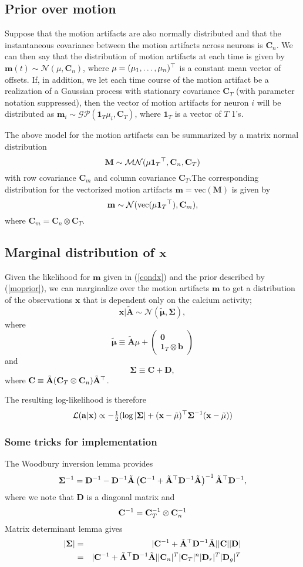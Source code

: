 \documentclass[11pt]{article}
\newcommand{\vecm}{\mathbf{m}}
\newcommand{\veca}{\mathbf{a}}
\newcommand{\matD}{\mathbf{D}}
\newcommand{\matC}{\mathbf{C}}
\newcommand{\vecb}{\mathbf{b}}
\newcommand{\vecx}{\mathbf{x}}
\newcommand{\matM}{\mathbf{M}}
\newcommand{\tA}{\tilde{\mathbf{A}}}
\newcommand{\margmu}{\tilde{\mathbf{\mu}}}
\newcommand{\matSig}{\mathbf{\Sigma}}
\begin{document}
\subsection{Prior over motion}
Suppose that the motion artifacts are also normally distributed and that the instantaneous covariance between the motion artifacts across neurons is $\matC_n$.  We can then say that the distribution of motion artifacts at each time is given by $\vecm(t)\sim\mathcal{N}(\mu,\matC_n)$, where $\mu = (\mu_1,\dots,\mu_n){^\top}$ is a constant mean vector of offsets.
If, in addition, we let each time course of the motion artifact be a realization of a Gaussian process with stationary covariance $\matC_T$ (with parameter notation suppressed), then the vector of motion artifacts for neuron $i$ will be distributed as $\vecm_i\sim\mathcal{GP}(\mathbf{1}_T\mu_i,\matC_T)$, where $\mathbf{1}_T$ is a vector of $T$ 1's. 

 The above model for the motion artifacts can be summarized by a matrix normal distribution
\begin{equation}\label{moprior}
\matM\sim\mathcal{MN}(\mu\mathbf{1}_T\trp,\matC_n,\matC_T)
\end{equation}
with row covariance $\matC_m$ and column covariance $\matC_T$.The corresponding distribution for the vectorized motion artifacts $\vecm = \text{vec}(\matM)$ is given by
\[
\vecm\sim \mathcal{N}(\text{vec}(\mu\mathbf{1}_T\trp),\matC_m),
\]
where $\matC_m = \matC_n\otimes\matC_T$.

\subsection{Marginal distribution of $\vecx$}
Given the likelihood for $\vecm$ given in (\ref{condx}) and the prior described by (\ref{moprior}), we can marginalize over the motion artifacts $\vecm$ to get a distribution of the observations $\vecx$ that is dependent only on the calcium activity;
\[
\vecx|\tA \sim\mathcal{N}(\margmu,\matSig),
\]
where 
\[\margmu\equiv\tA\mu + \left(
\begin{array}{c}
\mathbf{0}\\
\mathbf{1}_T\otimes \vecb
\end{array}
\right)
\]
and 
\[
\matSig\equiv \matC+\matD,
\]
where $\matC\equiv\tA(\matC_T\otimes\matC_n)\tA\trp$.

The resulting log-likelihood is therefore 
\[
\mathcal{L}(\veca|\vecx) \propto -\tfrac{1}{2}(\log|\matSig| + (\vecx-\margmu)\trp\matSig\inv(\vecx-\margmu))
\]
\subsubsection{Some tricks for implementation}
The Woodbury inversion lemma provides
\[
\matSig\inv = \matD\inv - \matD\inv\tA\left(\matC\inv + \tA\trp\matD\inv\tA\right)\inv\tA\trp\matD\inv,
\]
where we note that $\matD$ is a diagonal matrix and 
\[
\matC\inv = \matC_T\inv\otimes\matC_n\inv
\]
Matrix determinant lemma gives
\begin{eqnarray}
|\matSig|  &=& |\matC\inv + \tA\trp \matD \inv \tA||\matC||\matD|\\
&=&|\matC\inv + \tA\trp\matD\inv\tA||\matC_n|^T|\matC_T|^n|\matD_r|^T|\matD_g|^T
\end{eqnarray}
\end{document}
